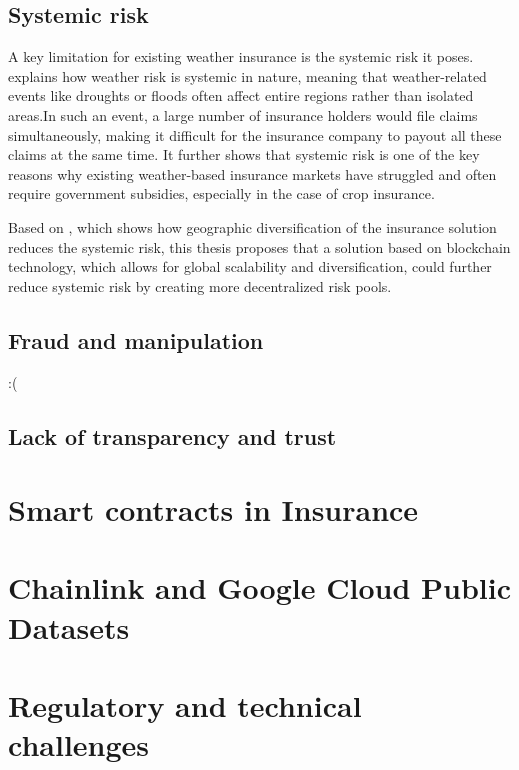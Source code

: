 \subsection{Systemic risk}

A key limitation for existing weather insurance is the systemic risk it poses. \autocite{xu2010systemic} explains how weather risk is systemic in nature, meaning that weather-related events like droughts or floods often affect entire regions rather than isolated areas.In such an event, a large number of insurance holders would file claims simultaneously, making it difficult for the insurance company to payout all these claims at the same time. It further shows that systemic risk is one of the key reasons why existing weather-based insurance markets have struggled and often require government subsidies, especially in the case of crop insurance. 

Based on \autocite{salgueiro2021diversification}, which shows how geographic diversification of the insurance solution reduces the systemic risk, this thesis proposes that a solution based on blockchain technology, which allows for global scalability and diversification, could further reduce systemic risk by creating more decentralized risk pools.

\subsection{Fraud and manipulation}

:(

\subsection{Lack of transparency and trust}

\section{Smart contracts in Insurance}\label{section:smart_contracts_insurance}
\section{Chainlink and Google Cloud Public Datasets}\label{section:chainlink_google_cloud_datasets}
\section{Regulatory and technical challenges}\label{section:regulatory_technical_challenges}

